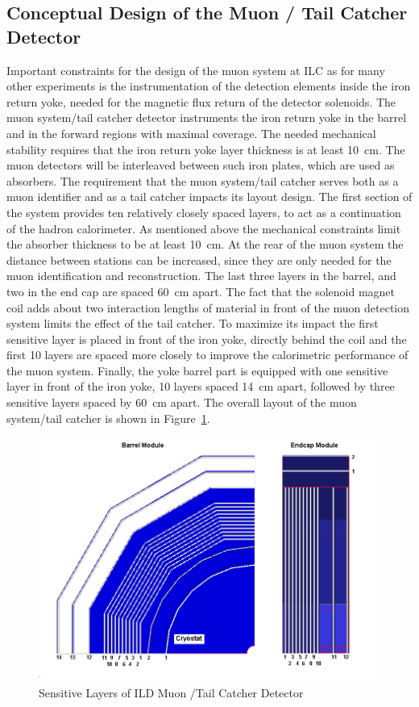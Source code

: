 \subsection{Conceptual Design of the Muon / Tail Catcher Detector}
Important constraints for the design of the muon system at ILC as for many other experiments is the instrumentation of the detection elements inside the iron return yoke, needed for the magnetic flux return of the detector solenoids.
The muon system/tail catcher detector instruments the iron return yoke in the barrel and in the forward regions with maximal coverage.
The needed mechanical stability requires that the iron return yoke layer thickness is at least \SI{10}{cm}. The muon detectors will be interleaved between such iron plates, which are used as absorbers.
The requirement that the muon system/tail catcher serves both as a muon identifier and as a tail catcher impacts its layout design.
The first section of the system provides ten relatively closely spaced layers, to act as a continuation of the hadron calorimeter.
As mentioned above the mechanical constraints limit the absorber thickness to be at least \SI{10}{cm}.
At the rear of the muon system the distance between stations can be increased, since they are only needed for the muon identification and reconstruction.
The last three layers in the barrel, and two in the end cap are spaced \SI{60}{cm} apart.
The fact that the solenoid magnet coil adds about two interaction lengths of material in front of the muon detection system limits the effect of the tail catcher.
To maximize its impact the first sensitive layer is placed in front of the iron yoke, directly behind the coil and the first 10 layers are spaced more closely
to improve the calorimetric performance of the muon system.
Finally, the yoke barrel part is equipped with one sensitive layer in front of the iron yoke, 10 layers spaced \SI{14}{cm} apart, followed by three sensitive layers spaced by \SI{60}{cm} apart. The overall layout of the muon system/tail catcher is shown in Figure~\ref{fig:ild:muon:concept}.
\begin{figure}
	\centering
\includegraphics[height=8cm]{MuonDetector/MuonDetectorILD/2D_barel_endcap.png}
	\caption{Sensitive Layers of ILD Muon /Tail Catcher Detector}
	\label{fig:ild:muon:concept}
\end{figure}

